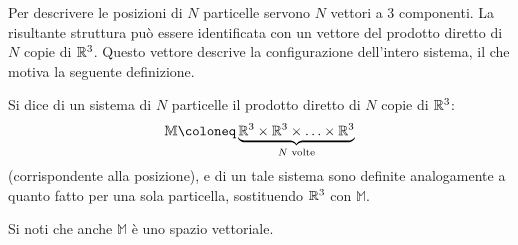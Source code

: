 Per descrivere le posizioni di $N$ particelle servono $N$ vettori a 3 componenti. La risultante struttura può essere identificata con un vettore del prodotto diretto di $N$ copie di $\mathbb{R}^3$. Questo vettore descrive la configurazione dell'intero sistema, il che motiva la seguente definizione.
\begin{definition} \label{def:configSpace}
  Si dice  di un sistema di $N$ particelle il prodotto diretto di $N$ copie di $\mathbb{R}^3$: \begin{equation}
  \mathbb{M} \defeq \underbrace{\R^3 \times \R^3 \times \ldots \times \R^3}_{N \text{ volte}}
  \end{equation} 
   (corrispondente alla posizione),  e  di un tale sistema sono definite analogamente a quanto fatto per una sola particella, sostituendo $\mathbb{R}^3$ con $\mathbb{M}$.
\end{definition}
\begin{remark}
  Si noti che anche $\mathbb{M}$ è uno spazio vettoriale. 
\end{remark}

